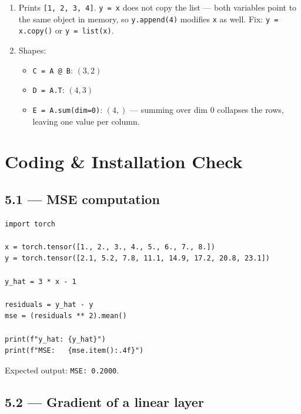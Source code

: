 \documentclass[12pt, a4paper]{scrartcl}
\begin{document}
\begin{enumerate}

\item Prints \texttt{[1, 2, 3, 4]}. \texttt{y = x} does not copy the list --- both variables point to the same object in memory, so \texttt{y.append(4)} modifies \texttt{x} as well. Fix: \texttt{y = x.copy()} or \texttt{y = list(x)}.

\item Shapes:
\begin{itemize}
    \item \texttt{C = A @ B}: $(3, 2)$
    \item \texttt{D = A.T}: $(4, 3)$
    \item \texttt{E = A.sum(dim=0)}: $(4,)$ --- summing over dim 0 collapses the rows, leaving one value per column.
\end{itemize}

\end{enumerate}

\section{Coding \& Installation Check}

\subsection*{5.1 --- MSE computation}

\begin{verbatim}
import torch

x = torch.tensor([1., 2., 3., 4., 5., 6., 7., 8.])
y = torch.tensor([2.1, 5.2, 7.8, 11.1, 14.9, 17.2, 20.8, 23.1])

y_hat = 3 * x - 1

residuals = y_hat - y
mse = (residuals ** 2).mean()

print(f"y_hat: {y_hat}")
print(f"MSE:   {mse.item():.4f}")
\end{verbatim}

Expected output: \texttt{MSE: 0.2000}.

\subsection*{5.2 --- Gradient of a linear layer}
\end{document}
